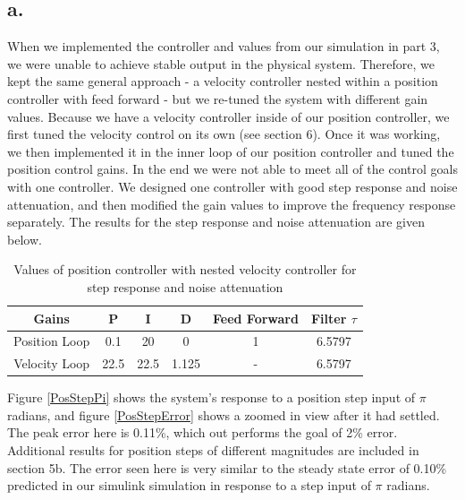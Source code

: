\documentclass{article}
\theoremstyle{plain}
\theoremstyle{definition}
\theoremstyle{remark}
\begin{document}
\subsection*{a.}
When we implemented the controller and values from our simulation in part 3, we were unable to achieve stable output in the physical system. Therefore, we kept the same general approach - a velocity controller nested within a position controller with feed forward - but we re-tuned the system with different gain values. Because we have a velocity controller inside of our position controller, we first tuned the velocity control on its own (see section 6). Once it was working, we then implemented it in the inner loop of our position controller and tuned the position control gains. In the end we were not able to meet all of the control goals with one controller. We designed one controller with good step response and noise attenuation, and then modified the gain values to improve the frequency response separately. The results for the step response and noise attenuation are given below.\\


\begin{table}[htb]
\begin{center}
    \begin{tabular}{|c|c|c|c|c|c|}
        \hline
        Gains & P   & I & D   & Feed Forward   & Filter $\tau$   \\ \hline
        Position Loop            & 0.1 & 20  & 0 & 1 & 6.5797    \\ 
        Velocity Loop       & 22.5   & 22.5    & 1.125   & -  & 6.5797  \\ 
       \hline
    \end{tabular}
\end{center}
\caption{Values of position controller with nested velocity controller for step response and noise attenuation}
\label{positionGains}
\end{table}

Figure \ref{PosStepPi} shows the system's response to a position step input of $\pi$ radians, and figure \ref{PosStepError} shows a zoomed in view after it had settled. The peak error here is 0.11\%, which out performs the goal of 2\% error. Additional results for position steps of different magnitudes are included in section 5b.  The error seen here is very similar to the steady state error of 0.10\% predicted in our simulink simulation in response to a step input of $\pi$ radians.\\
\end{document}
